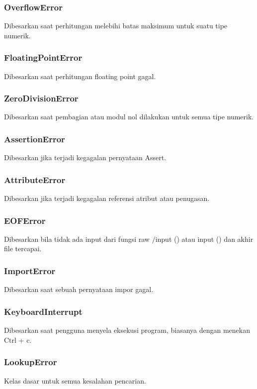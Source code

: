 \subsubsection{OverflowError}
Dibesarkan saat perhitungan melebihi batas maksimum untuk suatu tipe numerik.

\subsubsection{FloatingPointError}
Dibesarkan saat perhitungan floating point gagal.

\subsubsection{ZeroDivisionError}
Dibesarkan saat pembagian atau modul nol dilakukan untuk semua tipe numerik.

\subsubsection{AssertionError}
Dibesarkan jika terjadi kegagalan pernyataan Assert.

\subsubsection{AttributeError}
Dibesarkan jika terjadi kegagalan referensi atribut atau penugasan. 

\subsubsection{EOFError}
Dibesarkan bila tidak ada input dari fungsi raw $ / $input () atau input () dan akhir file tercapai.

\subsubsection{ImportError}
Dibesarkan saat sebuah pernyataan impor gagal.

\subsubsection{KeyboardInterrupt}
Dibesarkan saat pengguna menyela eksekusi program, biasanya dengan menekan Ctrl + c.

\subsubsection{LookupError}
Kelas dasar untuk semua kesalahan pencarian.

